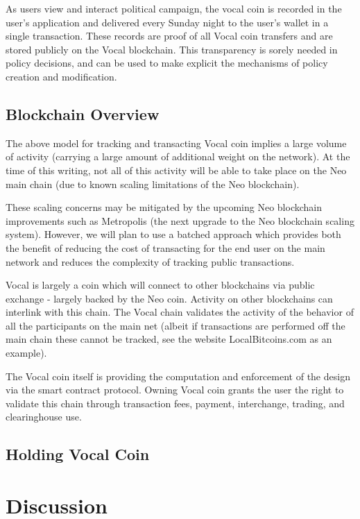 \documentclass[conference]{IEEEtran}
\begin{document}
    As users view and interact political campaign, the vocal coin is recorded in the user's application and delivered every Sunday night to the user's wallet in a single transaction.
    These records are proof of all Vocal coin transfers and are stored publicly on the Vocal blockchain. This transparency is sorely needed in policy decisions, and can be used to make explicit the mechanisms of policy creation and modification.

    \subsection{Blockchain Overview}

    The above model for tracking and transacting Vocal coin implies a large volume of activity (carrying a large amount of additional weight on the network). At the time of this writing, not all of this activity will be able to take place on the Neo main chain (due to known scaling limitations of the Neo blockchain).

    These scaling concerns may be mitigated by the upcoming Neo blockchain improvements such as Metropolis (the next upgrade to the Neo blockchain scaling system). However, we will plan to use a batched approach which provides both the benefit of reducing the cost of transacting for the end user on the main network and reduces the complexity of tracking public transactions.

   Vocal is largely a coin which will connect to other blockchains via public exchange - largely backed by the Neo coin. Activity on other blockchains can interlink with this chain. The Vocal chain validates the activity of the behavior of all the participants on the main net (albeit if transactions are performed off the main chain these cannot be tracked, see the website LocalBitcoins.com as an example).

    The Vocal coin itself is providing the computation and enforcement of the design via the smart contract protocol. Owning Vocal coin grants the user the right to validate this chain through transaction fees, payment, interchange, trading, and clearinghouse use. 

    \subsection{Holding Vocal Coin}

    \section{Discussion}
\end{document}
